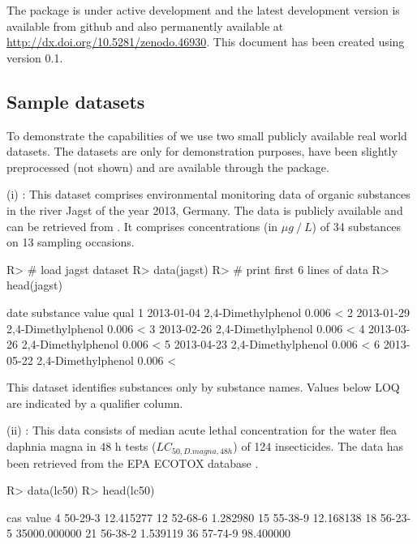 \documentclass[article, shortnames]{jss}\usepackage[]{graphicx}\usepackage[]{color}
\begin{document}
The package is under active development and the latest development version is available from github and also permanently available at \url{http://dx.doi.org/10.5281/zenodo.46930}.
This document has been created using  version 0.1.


\subsection[Sample datasets]{Sample datasets}
To demonstrate the capabilities of   we use two small publicly available real world datasets.
The datasets are only for demonstration purposes, have been slightly preprocessed (not shown) and are available through the package.

(i) : This dataset comprises environmental monitoring data of organic substances in the river Jagst of the year 2013, Germany.
The data is publicly available and can be retrieved from .
It comprises concentrations  (in $\mu g~/~L$) of  34 substances  on 13 sampling occasions.

\begin{CodeChunk}
\begin{CodeInput}
R> # load jagst dataset
R> data(jagst)
R> # print first 6 lines of data
R> head(jagst)
\end{CodeInput}
\begin{CodeOutput}
        date          substance value qual
1 2013-01-04 2,4-Dimethylphenol 0.006    <
2 2013-01-29 2,4-Dimethylphenol 0.006    <
3 2013-02-26 2,4-Dimethylphenol 0.006    <
4 2013-03-26 2,4-Dimethylphenol 0.006    <
5 2013-04-23 2,4-Dimethylphenol 0.006    <
6 2013-05-22 2,4-Dimethylphenol 0.006    <
\end{CodeOutput}
\end{CodeChunk}

This dataset identifies substances only by substance names. Values below LOQ are indicated by a qualifier column.

(ii) : This data consists of median acute lethal concentration for the water flea daphnia magna in 48 h tests ($LC_{50, D.magna, 48h}$) of 124 insecticides.
The data has been retrieved from the EPA ECOTOX database \citep{epa_2016}.

\begin{CodeChunk}
\begin{CodeInput}
R> data(lc50)
R> head(lc50)
\end{CodeInput}
\begin{CodeOutput}
       cas        value
4  50-29-3    12.415277
12 52-68-6     1.282980
15 55-38-9    12.168138
18 56-23-5 35000.000000
21 56-38-2     1.539119
36 57-74-9    98.400000
\end{CodeOutput}
\end{CodeChunk}
\end{document}
